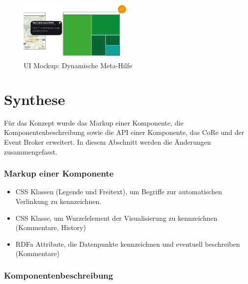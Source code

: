 \documentclass[
	headsepline,
	footsepline,
	fontsize=12pt,
	bibliography=totoc
]{scrbook}
\begin{document}
\begin{figure}[htbp]
   \centering
   \includegraphics[width=0.5\textwidth]{images/konzeption-meta-dyn.png}
   \caption{UI Mockup: Dynamische Meta-Hilfe}
   \label{figure:meta-dyn}
\end{figure}

\section{Synthese}
\label{section:konzeption:synthese}

Für das Konzept wurde das Markup einer Komponente, die Komponentenbeschreibung sowie die API einer Komponente, das CoRe und der Event Broker erweitert. In diesem Abschnitt werden die Änderungen zusammengefasst.

\subsubsection{Markup einer Komponente}

\begin{itemize}
	\item CSS Klassen (Legende und Freitext), um Begriffe zur automatischen Verlinkung zu kennzeichnen.
	\item CSS Klasse, um Wurzelelement der Visualisierung zu kennzeichnen (Kommentare, History)
	\item RDFa Attribute, die Datenpunkte kennzeichnen und eventuell beschreiben (Kommentare)
\end{itemize}

\subsubsection{Komponentenbeschreibung}
\end{document}
